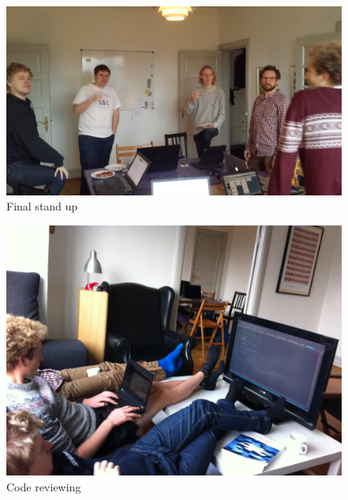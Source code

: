 \begin{figure}[h]
\begin{center}
\includegraphics[scale=0.1]{img/SCRUM/standUp2.jpg}
\caption{Final stand up}
\label{fig:Stand Up 2}
\end{center}
\end{figure}

\begin{figure}[h]
\begin{center}
\includegraphics[scale=0.1]{img/SCRUM/codeReview.jpg}
\caption{Code reviewing}
\label{fig:Code review}
\end{center}
\end{figure}

       
